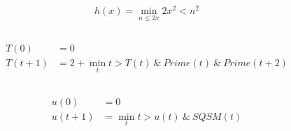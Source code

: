 \subsection{}
\[ h(x) = \min_{n\le 2x}{2x^2<n^2} \]

\subsection{}
\begin{align*}
  T(0)   & = 0 \\
  T(t+1) & = 2 + \min_{t}t>T(t) \ \&\ Prime(t) \ \&\ Prime(t+2)
\end{align*}


\subsection{}
\begin{align*}
  u(0)   & = 0 \\
  u(t+1) & = \min_{t}t>u(t) \ \&\ SQSM(t)
\end{align*}